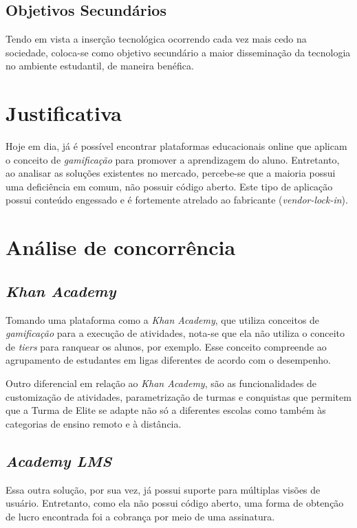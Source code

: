 \subsection{Objetivos Secundários}
Tendo em vista a inserção tecnológica ocorrendo cada vez mais cedo na sociedade, coloca-se como objetivo secundário a maior disseminação da tecnologia no ambiente estudantil, de maneira benéfica.

\section{Justificativa}
Hoje em dia, já é possível encontrar plataformas educacionais online que aplicam o conceito de \textit{gamificação} para promover a aprendizagem do aluno. Entretanto, ao analisar as soluções existentes no mercado, percebe-se que a maioria possui uma deficiência em comum, não possuir código aberto. Este tipo de aplicação possui conteúdo engessado e é fortemente atrelado ao fabricante (\textit{\gls{vendor-lock-in}}). 


\section{Análise de concorrência}
\subsection{\textit{Khan Academy}}
Tomando uma plataforma como a \textit{Khan Academy}, que utiliza conceitos de \textit{gamificação} para a execução de atividades, nota-se que ela não utiliza o conceito de \textit{\glspl{tier}} para ranquear os alunos, por exemplo. Esse conceito compreende ao agrupamento de estudantes em ligas diferentes de acordo com o desempenho.

Outro diferencial em relação ao \textit{Khan Academy}, são as funcionalidades de customização de atividades, parametrização de turmas e conquistas que permitem que a Turma de Elite se adapte não só a diferentes escolas como também às categorias de ensino remoto e à distância.

\subsection{\textit{Academy LMS}}
Essa outra solução, por sua vez, já possui suporte para múltiplas visões de usuário.
Entretanto, como ela não possui código aberto, uma forma de obtenção de lucro encontrada foi a cobrança por meio de uma assinatura.

